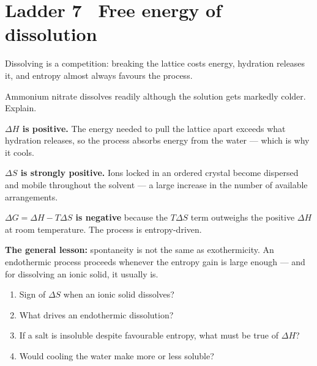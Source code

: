 \documentclass{apchem-worksheet}
\begin{document}
\section*{\sffamily Ladder 7 \textbullet\ Free energy of dissolution}

Dissolving is a competition: breaking the lattice costs energy, hydration
releases it, and entropy almost always favours the process.

\begin{workedexample}
Ammonium nitrate dissolves readily although the solution gets markedly
colder. Explain.

\textbf{$\Delta H$ is positive.} The energy needed to pull the lattice
apart exceeds what hydration releases, so the process absorbs energy from
the water --- which is why it cools.

\textbf{$\Delta S$ is strongly positive.} Ions locked in an ordered
crystal become dispersed and mobile throughout the solvent --- a large
increase in the number of available arrangements.

\textbf{$\Delta G = \Delta H - T\Delta S$ is negative} because the
$T\Delta S$ term outweighs the positive $\Delta H$ at room temperature.
The process is entropy-driven.

\textbf{The general lesson:} spontaneity is not the same as
exothermicity. An endothermic process proceeds whenever the entropy gain
is large enough --- and for dissolving an ionic solid, it usually is.
\end{workedexample}

\begin{yourturn}
\begin{enumerate}[leftmargin=*,itemsep=0.5em]
  \item Sign of $\Delta S$ when an ionic solid dissolves?
        \workspace[1.4cm]
  \item What drives an endothermic dissolution? \workspace[1.4cm]
  \item If a salt is insoluble despite favourable entropy, what must be
        true of $\Delta H$? \workspace[1.8cm]
  \item Would cooling the water make  more or less soluble?
        \workspace[1.8cm]
\end{enumerate}
\end{yourturn}
\end{document}
